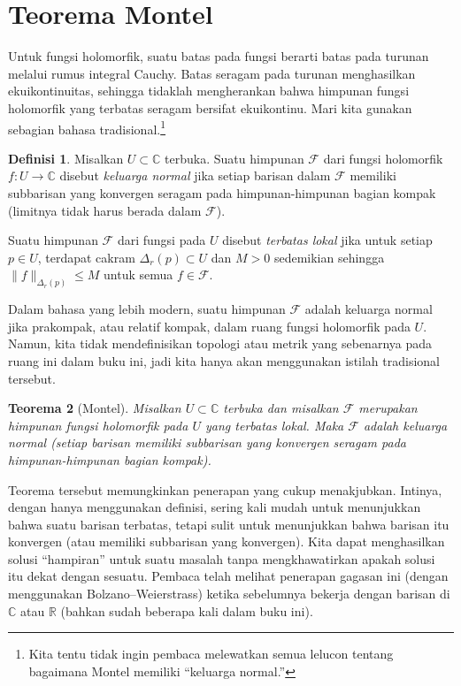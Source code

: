 \documentclass[12pt,openany]{book}
\newcommand{\snorm}[1]{\lVert {#1} \rVert}
\newcommand{\C}{{\mathbb{C}}}
\newcommand{\R}{{\mathbb{R}}}
\newcommand{\sF}{{\mathscr{F}}}
\newcommand{\myindex}[1]{#1\index{#1}}
\newcommand{\myquote}[1]{``#1''}
\theoremstyle{plain}
\newtheorem{thm}{Teorema}[section]
\theoremstyle{remark}
\theoremstyle{definition}
\newtheorem{defn}[thm]{Definisi}
\theoremstyle{exercise}
\theoremstyle{example}
\begin{document}

\section{Teorema Montel}
\label{sec:montel}

Untuk fungsi holomorfik, suatu batas pada fungsi berarti
batas pada turunan melalui rumus integral Cauchy.  Batas seragam
pada turunan menghasilkan ekuikontinuitas, sehingga
tidaklah
mengherankan bahwa himpunan fungsi holomorfik yang terbatas seragam
bersifat ekuikontinu.
Mari kita gunakan sebagian bahasa tradisional.\footnote{%
Kita tentu tidak ingin pembaca melewatkan semua
lelucon tentang bagaimana Montel memiliki \myquote{keluarga normal.}}

\begin{defn}
Misalkan $U \subset \C$ terbuka.
Suatu himpunan $\sF$ dari fungsi holomorfik $f \colon U \to \C$ disebut
\emph{\myindex{keluarga normal}} jika setiap barisan dalam $\sF$ memiliki subbarisan
yang konvergen seragam pada himpunan-himpunan bagian kompak (limitnya tidak harus berada dalam $\sF$).

Suatu himpunan $\sF$ dari fungsi pada $U$ disebut \emph{\myindex{terbatas lokal}}
jika untuk setiap $p \in U$, terdapat cakram $\Delta_r(p) \subset U$ dan $M > 0$
sedemikian sehingga 
$\snorm{f}_{\Delta_r(p)} \leq M$ untuk semua $f \in \sF$.
\end{defn}

Dalam bahasa yang lebih modern, suatu himpunan $\sF$ adalah keluarga normal jika prakompak, atau
relatif kompak, dalam ruang fungsi holomorfik pada $U$.  Namun, kita
tidak mendefinisikan topologi atau metrik yang sebenarnya pada ruang ini dalam buku ini, jadi
kita hanya akan menggunakan istilah tradisional tersebut.

\begin{thm}[Montel]
Misalkan $U \subset \C$ terbuka dan misalkan $\sF$
merupakan himpunan fungsi holomorfik pada $U$ yang terbatas lokal.
Maka $\sF$ adalah keluarga normal (setiap barisan memiliki subbarisan yang
konvergen seragam pada himpunan-himpunan bagian kompak).
\end{thm}

Teorema tersebut memungkinkan penerapan yang cukup menakjubkan.  Intinya,
dengan hanya menggunakan definisi, sering kali mudah untuk menunjukkan bahwa suatu barisan terbatas,
tetapi sulit untuk menunjukkan bahwa barisan itu konvergen (atau memiliki subbarisan yang konvergen).
Kita dapat menghasilkan solusi \myquote{hampiran} untuk suatu masalah tanpa mengkhawatirkan
apakah solusi itu dekat dengan sesuatu.
Pembaca telah melihat penerapan gagasan ini (dengan menggunakan Bolzano--Weierstrass)
ketika sebelumnya bekerja dengan barisan di $\C$ atau $\R$ (bahkan sudah beberapa kali dalam
buku ini).
\end{document}
